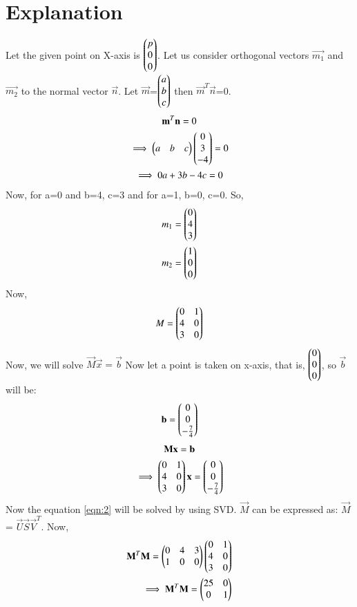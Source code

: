 \documentclass[journal,12pt,twocolumn]{IEEEtran}
\begin{document}
\section{Explanation}
Let the given point on X-axis is $\begin{pmatrix}p\\0\\0\end{pmatrix}$. Let us consider orthogonal vectors $\vec{m_1}$ and $\vec{m_2}$ to the normal vector $\vec{n}$.
Let $\vec{m}$=$\begin{pmatrix}a\\b\\c\end{pmatrix}$ then $\vec{m}^T \vec{n}$=0.
\begin{multline}
\mathbf{m}^T \mathbf{n} = 0\\
\implies \begin{pmatrix}a&b&c\end{pmatrix} \begin{pmatrix}0\\3\\-4\end{pmatrix} = 0\\
\implies 0 a + 3b -4c = 0
\end{multline}
Now, for a=0 and b=4, c=3 and for a=1, b=0, c=0. So,
\begin{align}
m_1 = \begin{pmatrix}0\\4\\3\end{pmatrix}\\
m_2 = \begin{pmatrix}1\\0\\0\end{pmatrix}
\end{align}
Now,
\begin{align}
M = \begin{pmatrix}0 & 1\\4 & 0\\3 & 0\end{pmatrix}
\end{align}
Now, we will solve $\vec{M}\vec{x}=\vec{b}$
Now let a point is taken on x-axis, that is, $\begin{pmatrix}0\\0\\0\end{pmatrix}$, so $\vec{b}$ will be:
\begin{align}
\mathbf{b}=\begin{pmatrix}0\\0\\-\frac{7}{4}\end{pmatrix}
\end{align}
\begin{multline}
\mathbf{M}\mathbf{x}=\mathbf{b}\\
\implies \begin{pmatrix}0 & 1\\4 & 0\\3 & 0\end{pmatrix}\mathbf{x}= \begin{pmatrix}0\\0\\-\frac{7}{4}\end{pmatrix}
\label{eqn:2}
\end{multline}
Now the equation \ref{eqn:2} will be solved by using SVD.
$\vec{M}$ can be expressed as: $\vec{M}$ = $\vec{U} \vec{S} \vec{V}^T$.
Now, 
\begin{align}
\mathbf{M}^T \mathbf{M} = \begin{pmatrix}0& 4& 3\\1 & 0 & 0\end{pmatrix} \begin{pmatrix}0 & 1\\4 & 0\\3 & 0\end{pmatrix}\\
\implies \mathbf{M}^T \mathbf{M} = \begin{pmatrix}25 & 0\\0 & 1\end{pmatrix}
\end{align}
\end{document}
